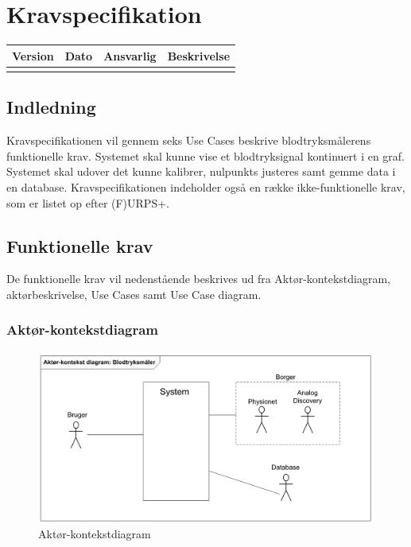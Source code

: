 \chapter{Kravspecifikation}

\begin{longtabu} to 
    Version &    Dato &    Ansvarlig &    Beskrivelse\\[-1ex]
    \midrule

\label{version_Systemark}
\end{longtabu}


\section{Indledning}
Kravspecifikationen vil gennem seks Use Cases beskrive blodtryksmålerens funktionelle krav. Systemet skal kunne vise et blodtryksignal kontinuert i en graf. Systemet skal udover det kunne kalibrer, nulpunkts justeres samt gemme data i en database. Kravspecifikationen indeholder også en række ikke-funktionelle krav, som er listet op efter (F)URPS+.   


\section{Funktionelle krav}
De funktionelle krav vil nedenstående beskrives ud fra Aktør-kontekstdiagram, aktørbeskrivelse, Use Cases samt Use Case diagram. 

\subsection{Aktør-kontekstdiagram}
\begin{figure}[H]
	\centering
	\includegraphics[width=1\textwidth]{Figurer/Snip20150929_7}
	\caption{Aktør-kontekstdiagram}
	\label{fig:aktoerbeskrivelse}
\end{figure}

